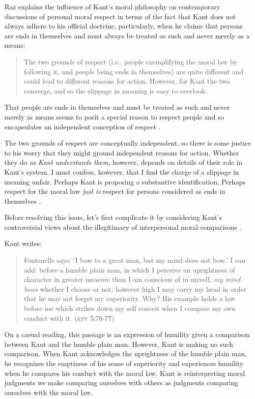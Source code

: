 \documentclass[a4paper,12pt]{article}
\begin{document}
Raz explains the influence of Kant's moral philosophy on contemporary discussions of personal moral respect in terms of the fact that Kant does not always adhere to his official doctrine, particularly, when he claims that persons are ends in themselves and must always be treated as such and never merely as a means: 
\begin{quote}
	The two grounds of respect (i.e., people exemplifying the moral law by following it, and people being ends in themselves) are quite different and could lead to different reasons for action. However, for Kant the two converge, and so the slippage in meaning is easy to overlook. \citep[136]{Raz:2001ps} 
\end{quote}
That people are ends in themselves and must be treated as such and never merely as means seems to posit a special reason to respect people and so encapsulates an independent conception of respect \citep[for discussion relevant to the distinction Raz is drawing see][]{Darwall:1977ty,Frankena:1986sf}.

The two grounds of respect are conceptually independent, so there is some justice to his worry that they might ground independent reasons for action. Whether they do \emph{as Kant understands them}, however, depends on details of their role in Kant's system. I must confess, however, that I find the charge of a slippage in meaning unfair. Perhaps Kant is proposing a substantive identification. Perhaps respect for the moral law \emph{just is} respect for persons considered as ends in themselves \citep[see][for a similar suggestion]{Velleman:2006nx}. 

Before resolving this issue, let's first complicate it by considering Kant's controversial views about the illegitimacy of interpersonal moral comparisons \citep[see][ch.~4, \S6]{Wood:1999zy}.

Kant writes: 
\begin{quote}
	Fontenelle says: `I bow to a great man, but my mind does not bow.' I can add: before a humble plain man, in which I perceive an uprightness of character in greater measure than I am conscious of in myself, \emph{my mind bows} whether I choose or not, however high I may carry my head in order that he may not forget my superiority. Why? His example holds a law before me which strikes down my self conceit when I compare my own conduct with it. (\textsc{kpv} 5:76-77) 
\end{quote}

On a casual reading, this passage is an expression of humility given a comparison between Kant and the humble plain man. However, Kant is making no such comparison. When Kant acknowledges the uprightness of the humble plain man, he recognizes the emptiness of his sense of superiority and experiences humility when he compares his conduct with the moral law. Kant is reinterpreting moral judgments we make comparing ourselves with others as judgments comparing ourselves with the moral law.
\end{document}
